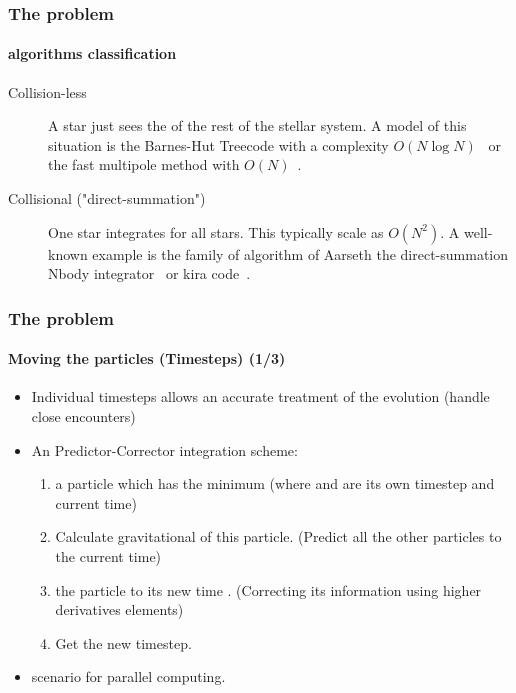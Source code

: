 \begin{frame}
    \frametitle{The {\nbody} problem}
    \framesubtitle{{\nbody} algorithms classification}

    \begin{description}
        \item[Collision-less]
            A star just sees the  of the rest of
            the stellar system.
            A model of this situation is the Barnes-Hut Treecode
            with a complexity $O(N\log N)$~\cite{BarnesHut86}
            or the fast multipole method with $O(N)$~\cite{GreendardThesis}.
            \vspace{0.7cm}
        \item[Collisional ("direct-summation")]
            One star integrates 
            for all stars. This typically scale as $O(N^{2})$.
            A well-known example is the family of algorithm of Aarseth
            the direct-summation {\sc Nbody} integrator~\cite{Aarseth99,Spurzem1999,Aarseth03}
            or {\sc kira} code~\cite{PortegiesZwartEtAl01}.
    \end{description}

\end{frame}


\begin{frame}
    \frametitle{The {\nbody} problem}
    \framesubtitle{Moving the particles (Timesteps) (1/3)}

    \begin{itemize}
        \item Individual timesteps allows an accurate treatment of the evolution
              (handle close encounters)
        \item An Predictor-Corrector integration scheme:
              \begin{enumerate}
                  \item {} a particle  which has the minimum 
                  (where  and  are its own timestep and current time)
                  \item Calculate gravitational  of this particle.
                        (Predict all the other particles to the current time)
                  \item {} the particle  to its new time
                        .
                        (Correcting its information using higher derivatives elements)
                  \item Get the new timestep.
              \end{enumerate}

        \item {} scenario for parallel computing.
    \end{itemize}
\end{frame}

